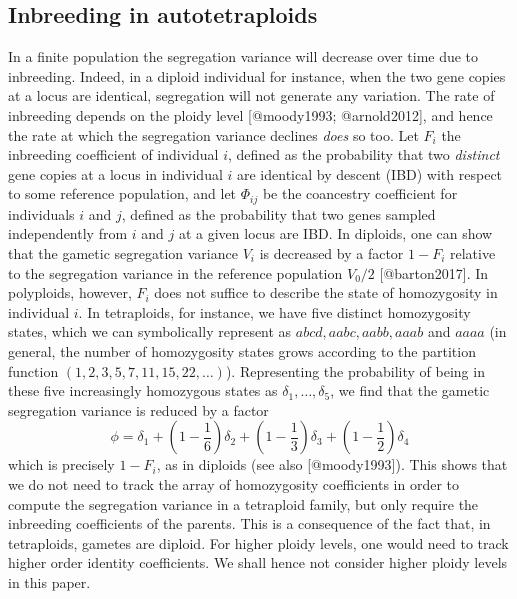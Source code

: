 \hypertarget{inbreeding-in-autotetraploids}{%
\subsection{Inbreeding in
autotetraploids}\label{inbreeding-in-autotetraploids}}

In a finite population the segregation variance will decrease over time
due to inbreeding. Indeed, in a diploid individual for instance, when
the two gene copies at a locus are identical, segregation will not
generate any variation. The rate of inbreeding depends on the ploidy
level {[}@moody1993; @arnold2012{]}, and hence the rate at which the
segregation variance declines \emph{does} so too. Let \(F_i\) the
inbreeding coefficient of individual \(i\), defined as the probability
that two \emph{distinct} gene copies at a locus in individual \(i\) are
identical by descent (IBD) with respect to some reference population,
and let \(\Phi_{ij}\) be the coancestry coefficient for individuals
\(i\) and \(j\), defined as the probability that two genes sampled
independently from \(i\) and \(j\) at a given locus are IBD. In
diploids, one can show that the gametic segregation variance \(V_i\) is
decreased by a factor \(1-F_i\) relative to the segregation variance in
the reference population \(V_0/2\) {[}@barton2017{]}. In polyploids,
however, \(F_i\) does not suffice to describe the state of homozygosity
in individual \(i\). In tetraploids, for instance, we have five distinct
homozygosity states, which we can symbolically represent as
\(abcd, aabc, aabb, aaab\) and \(aaaa\) (in general, the number of
homozygosity states grows according to the partition function
\((1,2,3,5,7,11,15,22,\dots)\)). Representing the probability of being
in these five increasingly homozygous states as
\(\delta_1, \dots, \delta_5\), we find that the gametic segregation
variance is reduced by a factor
\[\phi = \delta_1 + \left(1 - \frac1 6\right) \delta_2 + \left(1 - \frac1
        3\right)\delta_3 + \left(1 - \frac1 2\right) \delta_4\] which is
precisely \(1-F_i\), as in diploids (see also {[}@moody1993{]}). This
shows that we do not need to track the array of homozygosity
coefficients in order to compute the segregation variance in a
tetraploid family, but only require the inbreeding coefficients of the
parents. This is a consequence of the fact that, in tetraploids, gametes
are diploid. For higher ploidy levels, one would need to track higher
order identity coefficients. We shall hence not consider higher ploidy
levels in this paper.

